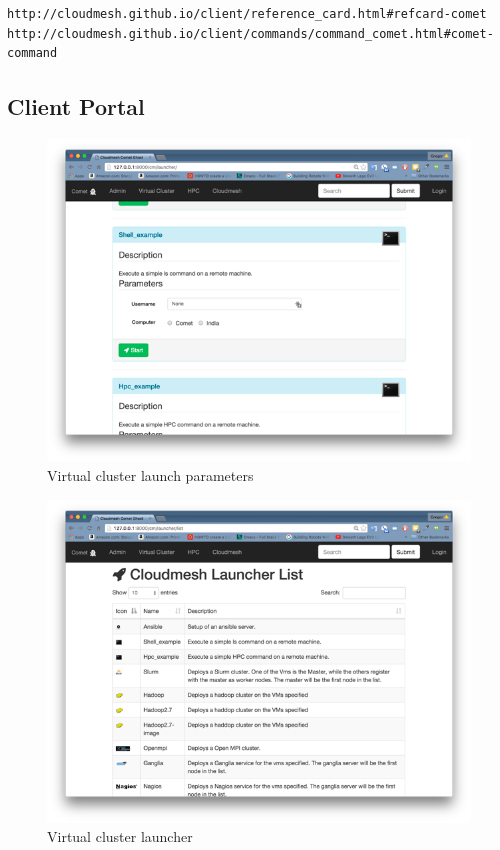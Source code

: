 \begin{verbatim}
http://cloudmesh.github.io/client/reference_card.html#refcard-comet
http://cloudmesh.github.io/client/commands/command_comet.html#comet-command
\end{verbatim}


\subsection{Client Portal}

\begin{figure}[htb] 
  \centering 
    \includegraphics[width=1.0\columnwidth]{images/client/Picture6.png} 
    \caption{Virtual cluster launch parameters}
    \label{F:6}
\end{figure} 

\begin{figure}[htb] 
  \centering 
    \includegraphics[width=1.0\columnwidth]{images/client/Picture7.png} 
    \caption{Virtual cluster launcher}
    \label{F:7}
\end{figure} 


